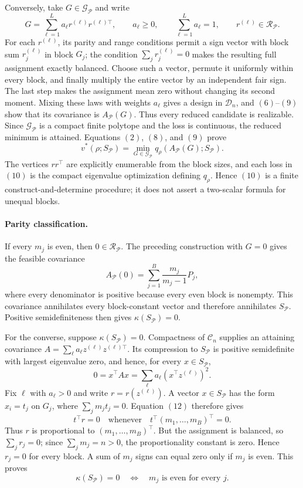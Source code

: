 Conversely, take \(G\in\mathcal G_{\mathcal P}\) and write
\[
G=\sum_{\ell=1}^L a_\ell r^{(\ell)}r^{(\ell)\top},
\qquad
a_\ell\geq0,
\qquad
\sum_{\ell=1}^L a_\ell=1,
\qquad
r^{(\ell)}\in\mathcal R_{\mathcal P}.
\tag{9}
\]
For each \(r^{(\ell)}\), its parity and range conditions permit a sign vector with block sum \(r_j^{(\ell)}\) in block \(G_j\); the condition \(\sum_jr_j^{(\ell)}=0\) makes the resulting full assignment exactly balanced.  Choose such a vector, permute it uniformly within every block, and finally multiply the entire vector by an independent fair sign.  The last step makes the assignment mean zero without changing its second moment.  Mixing these laws with weights \(a_\ell\) gives a design in \(\mathcal D_n\), and \((6)\)--\((9)\) show that its covariance is \(A_{\mathcal P}(G)\).  Thus every reduced candidate is realizable.  Since \(\mathcal G_{\mathcal P}\) is a compact finite polytope and the loss is continuous, the reduced minimum is attained.  Equations \((2)\), \((8)\), and \((9)\) prove
\[
v^*(\rho;S_{\mathcal P})
=\min_{G\in\mathcal G_{\mathcal P}}
q_\rho(A_{\mathcal P}(G);S_{\mathcal P}).
\tag{10}
\]
The vertices \(r r^\top\) are explicitly enumerable from the block sizes, and each loss in \((10)\) is the compact eigenvalue optimization defining \(q_\rho\).  Hence \((10)\) is a finite construct-and-determine procedure; it does not assert a two-scalar formula for unequal blocks.

\paragraph{Parity classification.}
If every \(m_j\) is even, then \(0\in\mathcal R_{\mathcal P}\).  The preceding construction with \(G=0\) gives the feasible covariance
\[
A_{\mathcal P}(0)
=\sum_{j=1}^B\frac{m_j}{m_j-1}P_j,
\tag{11}
\]
where every denominator is positive because every even block is nonempty.  This covariance annihilates every block-constant vector and therefore annihilates \(S_{\mathcal P}\).  Positive semidefiniteness then gives \(\kappa(S_{\mathcal P})=0\).

For the converse, suppose \(\kappa(S_{\mathcal P})=0\).  Compactness of \(\mathcal C_n\) supplies an attaining covariance \(A=\sum_\ell a_\ell z^{(\ell)}z^{(\ell)\top}\).  Its compression to \(S_{\mathcal P}\) is positive semidefinite with largest eigenvalue zero, and hence, for every \(x\in S_{\mathcal P}\),
\[
0=x^\top Ax
=\sum_\ell a_\ell(x^\top z^{(\ell)})^2.
\tag{12}
\]
Fix \(\ell\) with \(a_\ell>0\) and write \(r=r(z^{(\ell)})\).  A vector \(x\in S_{\mathcal P}\) has the form \(x_i=t_j\) on \(G_j\), where \(\sum_jm_jt_j=0\).  Equation \((12)\) therefore gives
\[
t^\top r=0
\quad\text{whenever}\quad
t^\top(m_1,\ldots,m_B)^\top=0.
\tag{13}
\]
Thus \(r\) is proportional to \((m_1,\ldots,m_B)^\top\).  But the assignment is balanced, so \(\sum_jr_j=0\); since \(\sum_jm_j=n>0\), the proportionality constant is zero.  Hence \(r_j=0\) for every block.  A sum of \(m_j\) signs can equal zero only if \(m_j\) is even.  This proves
\[
\kappa(S_{\mathcal P})=0
\quad\Longleftrightarrow\quad
m_j\text{ is even for every }j.
\tag{14}
\]

